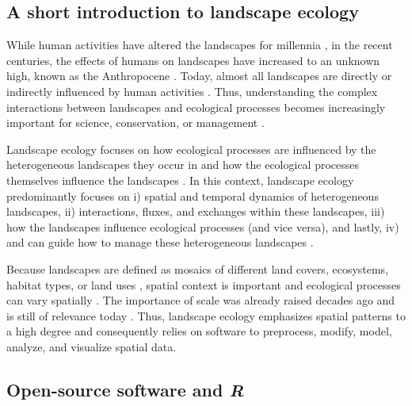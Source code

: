 \documentclass[smallextended]{svjour3}       %
\begin{document}
\hypertarget{sec:landscape_ecology}{%
\subsection{A short introduction to landscape ecology}\label{sec:landscape_ecology}}

While human activities have altered the landscapes for millennia \cite{Ellis2011,Ellis2015}, in the recent centuries, the effects of humans on landscapes have increased to an unknown high, known as the Anthropocene \cite{Crutzen2002}.
Today, almost all landscapes are directly or indirectly influenced by human activities \cite{Vitousek1997}.
Thus, understanding the complex interactions between landscapes and ecological processes becomes increasingly important for science, conservation, or management \cite{With2019}.

Landscape ecology focuses on how ecological processes are influenced by the heterogeneous landscapes they occur in and how the ecological processes themselves influence the landscapes \cite{Turner1989,Turner2005,With2019}.
In this context, landscape ecology predominantly focuses on i) spatial and temporal dynamics of heterogeneous landscapes, ii) interactions, fluxes, and exchanges within these landscapes, iii) how the landscapes influence ecological processes (and vice versa), and lastly, iv) and can guide how to manage these heterogeneous landscapes \cite{Risser1984,Turner1989}.

Because landscapes are defined as mosaics of different land covers, ecosystems, habitat types, or land uses \cite{Forman1986,Forman1995,Wiens1995a}, spatial context is important and ecological processes can vary spatially \cite{With2019}.
The importance of scale was already raised decades ago \cite{Wiens1989,Levin1992,Jelinski1996} and is still of relevance today \cite{Simova2012,Estes2018}.
Thus, landscape ecology emphasizes spatial patterns to a high degree \cite{Risser1984} and consequently relies on software to preprocess, modify, model, analyze, and visualize spatial data.

\hypertarget{sec:open_source}{%
\subsection{\texorpdfstring{Open-source software and \emph{R}}{Open-source software and R}}\label{sec:open_source}}
\end{document}

